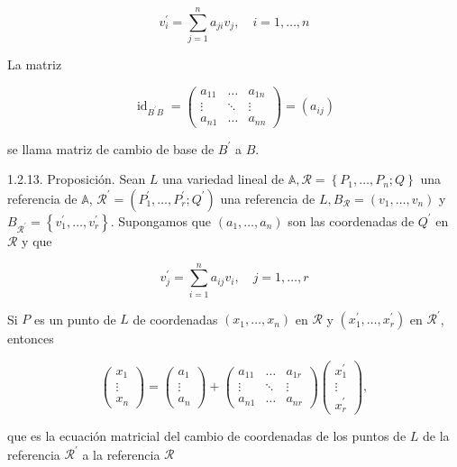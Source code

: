 \documentclass[12pt, a4paper, ones, notitlepage, openany,titlepage]{article}
\begin{document}
$$
v_{i}^{\prime}=\sum_{j=1}^{n} a_{j i} v_{j}, \quad i=1, \ldots, n
$$

La matriz

$$
\operatorname{id}_{B^{\prime} B}=\left(\begin{array}{rrr}
a_{11} & \ldots & a_{1 n} \\
\vdots & \ddots & \vdots \\
a_{n 1} & \ldots & a_{n n}
\end{array}\right)=\left(a_{i j}\right)
$$

se llama matriz de cambio de base de $B^{\prime}$ a $B$.

1.2.13. Proposición. Sean $L$ una variedad lineal de $\mathbb{A}, \mathcal{R}=\left\{P_{1}, \ldots, P_{n} ; Q\right\}$ una referencia de $\mathbb{A}$, $\mathcal{R}^{\prime}=\left(P_{1}^{\prime}, \ldots, P_{r}^{\prime} ; Q^{\prime}\right)$ una referencia de $L, B_{\mathcal{R}}=\left(v_{1}, \ldots, v_{n}\right)$ y $B_{\mathcal{R}^{\prime}}=\left\{v_{1}^{\prime}, \ldots, v_{r}^{\prime}\right\}$. Supongamos que $\left(a_{1}, \ldots, a_{n}\right)$ son las coordenadas de $Q^{\prime}$ en $\mathcal{R}$ y que

$$
v_{j}^{\prime}=\sum_{i=1}^{n} a_{i j} v_{i}, \quad j=1, \ldots, r
$$

Si $P$ es un punto de $L$ de coordenadas $\left(x_{1}, \ldots, x_{n}\right)$ en $\mathcal{R}$ y $\left(x_{1}^{\prime}, \ldots, x_{r}^{\prime}\right)$ en $\mathcal{R}^{\prime}$, entonces

$$
\left(\begin{array}{r}
x_{1} \\
\vdots \\
x_{n}
\end{array}\right)=\left(\begin{array}{r}
a_{1} \\
\vdots \\
a_{n}
\end{array}\right)+\left(\begin{array}{rll}
a_{11} & \ldots & a_{1 r} \\
\vdots & \ddots & \vdots \\
a_{n 1} & \ldots & a_{n r}
\end{array}\right)\left(\begin{array}{r}
x_{1}^{\prime} \\
\vdots \\
x_{r}^{\prime}
\end{array}\right),
$$

que es la ecuación matricial del cambio de coordenadas de los puntos de $L$ de la referencia $\mathcal{R}^{\prime}$ a la referencia $\mathcal{R}$
\end{document}

